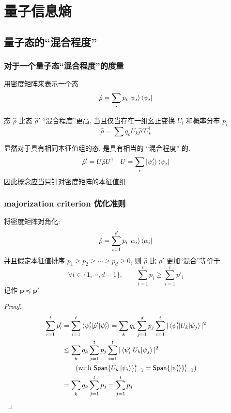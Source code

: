 \documentclass[12pt,hyperref={CJKbookmarks=true}]{beamer}
\renewcommand*{\vec}[1]{\bm{#1}}
\newcommand{\Span}{{\mathsf{Span}}}
\begin{document}
\section{量子信息熵} %
\label{sec:Quantum_entropy}
\begin{frame}
    \tableofcontents[currentsection]
\end{frame}
\subsection{量子态的``混合程度''} %
\label{sub:Intro_of_quantum_entropy}
\begin{frame}
    \frametitle{对于一个量子态``混合程度''的度量}
    用密度矩阵来表示一个态
    \begin{equation}
        \hat\rho  = \sum_i p_i\ket{\psi_i}\bra{\psi_i}
    \end{equation}\pause
    \begin{definition}
        态 $\hat\rho$ 比态 $\hat\rho'$ ``混合程度''更高, 
        当且仅当存在一组幺正变换 $U_i$ 和概率分布 $p_i$
        \begin{equation}
            \hat\rho = \sum q_k U_k\hat\rho' U_k^\dagger
        \end{equation}
    \end{definition}\pause
    显然对于具有相同本征值组的态, 是具有相当的 ``混合程度'' 的. 
    $$
     \hat\rho' = U\hat\rho U^\dagger\quad U = \sum_i\ket{\psi_i'}\bra{\psi_i}
    $$
    因此概念应当只针对密度矩阵的本征值组
\end{frame}
\begin{frame}[allowframebreaks]
    \frametitle[majorization criterion]{majorization criterion 优化准则}
    \begin{theorem}
        将密度矩阵对角化:
        \begin{equation}
            \hat\rho = \sum_{i=1}^d p_{i}\ket{\alpha_{i}}\bra{\alpha_{i}} 
        \end{equation}
        并且假定本征值排序 $p_{1}\ge p_{2}\ge\cdots\ge p_{d}\ge 0$, 
        则 $\hat\rho$ 比 $\hat\rho'$ 更加``混合''等价于
        \begin{equation}
            \forall t\in\{1,\cdots,d-1\},\qquad \sum_{i=1}^t p_{i}\ge\sum_{i=1}^t p'_{i}
        \end{equation}
        记作 $\vec p \preceq \vec p'$
    \end{theorem}

    \begin{proof}
        \begin{align*}
            \sum_{i=1}^t p'_{i} &= \sum_{i=1}^t \braket{\psi'_i|\hat\rho'|\psi'_i} 
            = \sum_k q_k \sum_{j=1}^d p_j\sum_{i=1}^t |\braket{\psi'_i|U_k|\psi_j}|^2 \\
            &\le \sum_k q_k \sum_{j=1}^t p_j\sum_{i=1}^t|\braket{\psi'_i|U_k|\psi_j}|^2 \\
                &\qquad (\mbox{with }\Span\{U_k\ket{\psi_i}\}_{i=1}^t=\Span\{\ket{\psi'_i}\}_{i=1}^t) \\
            &= \sum_k q_k \sum_{j=1}^t p_j = \sum_{j=1}^t p_j
        \end{align*}
    \end{proof}
\end{frame}
\end{document}
